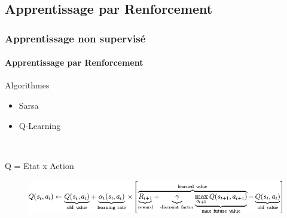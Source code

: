 \subsection{Apprentissage par Renforcement}

\begin{frame}
 \frametitle{Apprentissage non supervisé}
 \framesubtitle{Apprentissage par Renforcement}

  
  \begin{minipage}{0.4\textwidth}
    \begin{flushleft}
    Algorithmes 
      \begin{itemize}
	\item Sarsa
	\item Q-Learning
      \end{itemize}
    \end{flushleft}
  \end{minipage}
    ~ 
    \begin{minipage}{0.4\textwidth}
    \begin{flushright}
       Q = Etat x Action
      \end{flushright}
    \end{minipage}


    \begin{figure}
  \begin{center}
 \includegraphics[height=1.5cm]{images/qlearnupd.png} \\
 \end{center}
  \end{figure}
 
\end{frame}



